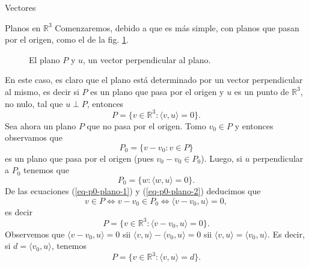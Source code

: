 \documentclass[a4paper,12pt,twoside,spanish,reqno]{amsbook}
\numberwithin{equation}{section}
\theoremstyle{definition}
\theoremstyle{remark}
\newcommand{\la}{\langle}
\newcommand{\ra}{\rangle}
\newcommand{\R}{\mathbb R}
\begin{document}
\begin{chapter}{Vectores}
\begin{section}{Planos en $\R^3$}
        Comenzaremos, debido a que es más simple, con planos que  pasan por el origen,  como el de la fig. \ref{fig-plano-por-origen}.
        \begin{figure}[h]
            \caption{El plano $P$ y $u$, un vector  perpendicular al plano.}
            \label{fig-plano-por-origen}
        \end{figure} 
    
        En  este caso,  es claro que el plano está determinado por un vector perpendicular al mismo, es decir si $P$  es un plano que pasa por el origen y $u$ es un punto de $\R^3$, no nulo, tal que $u \perp P$,  entonces
        \begin{equation*}
            P = \{ v \in \R^3: \la v,u \ra=0 \}. 
        \end{equation*}
        Sea ahora un  plano $P$ que no pasa por el origen.  Tomo $v_0 \in P$ y entonces observamos que
        \begin{equation}\label{eq-p0-plano-1}
            P_0 = \{v-v_0: v \in P \}
        \end{equation} 
        es un plano que pasa por el origen (pues $v_0-v_0 \in P_0$). Luego,  si $u$ perpendicular a $P_0$ tenemos que
        \begin{equation}\label{eq-p0-plano-2}
        P_0 = \{w: \la w,u \ra=0\}.
        \end{equation}
        De las ecuaciones (\ref{eq-p0-plano-1}) y  (\ref{eq-p0-plano-2}) deducimos que 
        \begin{equation*}
            v \in P \Leftrightarrow v-v_0 \in P_0 \Leftrightarrow \la v-v_0,u \ra=0,
        \end{equation*}
         es decir
        \begin{equation*}
            P = \{ v \in \R^3: \la v-v_0,u \ra=0 \}. 
        \end{equation*}  
        Observemos que  $\la v-v_0,u \ra=0$ sii $\la v,u \ra-\la v_0,u \ra=0$ sii $\la v,u \ra=\la v_0,u \ra$. Es decir, si $d = \la v_0,u \ra$, tenemos
        \begin{equation*}
        P = \{ v \in \R^3: \la v,u \ra=d \}. 
        \end{equation*} 
        

\end{section}
\end{chapter}
\end{document}
